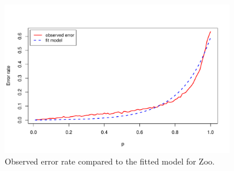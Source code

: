 \documentclass{article}
\begin{document}
\begin{figure}
 \centering
 \includegraphics[width=0.9\textwidth]{./figures/zoo.pdf}
 \caption{Observed error rate compared to the fitted model for Zoo.}
 \label{fig:zoo}
\end{figure}
\end{document}
